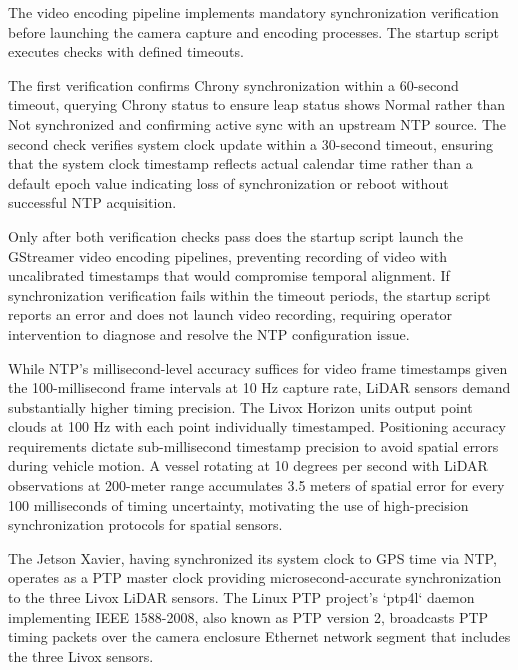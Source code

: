 \documentclass{erauthesis}
\begin{document}

The video encoding pipeline implements mandatory synchronization verification before launching the camera capture and encoding processes.
The startup script executes checks with defined timeouts.

The first verification confirms Chrony synchronization within a 60-second timeout, querying Chrony status to ensure leap status shows Normal rather than Not synchronized and confirming active sync with an upstream NTP source.
The second check verifies system clock update within a 30-second timeout, ensuring that the system clock timestamp reflects actual calendar time rather than a default epoch value indicating loss of synchronization or reboot without successful NTP acquisition.

Only after both verification checks pass does the startup script launch the GStreamer video encoding pipelines, preventing recording of video with uncalibrated timestamps that would compromise temporal alignment.
If synchronization verification fails within the timeout periods, the startup script reports an error and does not launch video recording, requiring operator intervention to diagnose and resolve the NTP configuration issue.


While NTP's millisecond-level accuracy suffices for video frame timestamps given the 100-millisecond frame intervals at 10 Hz capture rate, LiDAR sensors demand substantially higher timing precision.
The Livox Horizon units output point clouds at 100 Hz with each point individually timestamped.
Positioning accuracy requirements dictate sub-millisecond timestamp precision to avoid spatial errors during vehicle motion.
A vessel rotating at 10 degrees per second with LiDAR observations at 200-meter range accumulates 3.5 meters of spatial error for every 100 milliseconds of timing uncertainty, motivating the use of high-precision synchronization protocols for spatial sensors.

The Jetson Xavier, having synchronized its system clock to GPS time via NTP, operates as a PTP master clock providing microsecond-accurate synchronization to the three Livox LiDAR sensors.
The Linux PTP project's `ptp4l` daemon implementing IEEE 1588-2008, also known as PTP version 2, broadcasts PTP timing packets over the camera enclosure Ethernet network segment that includes the three Livox sensors.

\end{document}
